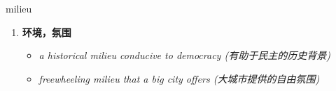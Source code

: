
\begin{frame}
{\huge milieu}
\begin{center}
\begin{enumerate}\Large
  \item \textbf{环境，氛围}
  \begin{itemize}
    \item \em{\Large{a historical milieu conducive to democracy (有助于民主的历史背景)}}
    \item \em{\Large{freewheeling milieu that a big city offers (大城市提供的自由氛围)}}
  \end{itemize}
\end{enumerate}
\end{center}
\end{frame}
